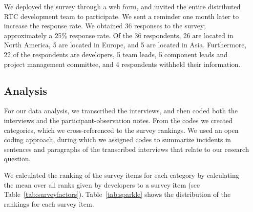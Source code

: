 \documentclass[12pt,oneside]{book}
\begin{document}
We deployed the survey through a web form, and invited the entire distributed RTC development team to participate. We sent a reminder one month later to increase the response rate. We obtained 36 responses to the survey; approximately a 25\% response rate.
Of the 36 respondents, 26 are located in North America, 5 are located in Europe, and 5 are located in Asia. Furthermore, 22 of the respondents are developers, 5 team leads, 5 component leads and project management committee, and 4 respondents withheld their information.







%

\subsection{Analysis} 
For our data analysis, we transcribed the interviews, and then coded both the interviews and the participant-observation notes. From the codes we created categories, which we cross-referenced to the survey rankings. We used an open coding approach, during which we assigned codes to summarize incidents in sentences and paragraphs of the transcribed interviews that relate to our research question.


We calculated the ranking of the survey items for each category by calculating the mean over all ranks given by developers to a survey item (see Table~\ref{tab:surveyfactors}).
Table~\ref{tab:sparkle} shows the distribution of the rankings for each survey item.
\end{document}
